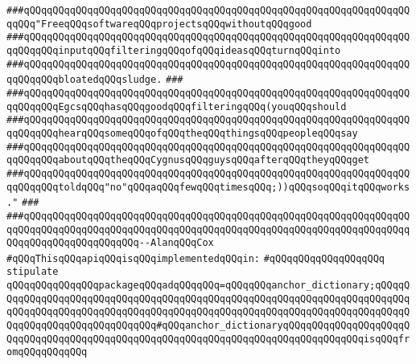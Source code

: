 \newline
\newline
\newline
\verb|###qQQqqQQqqQQqqQQqqQQqqQQqqQQqqQQqqQQqqQQqqQQqqQQqqQQqqQQqqQQqqQQqqQQqqQQq"FreeqQQqsoftwareqQQqprojectsqQQqwithoutqQQqgood|\newline
\verb|###qQQqqQQqqQQqqQQqqQQqqQQqqQQqqQQqqQQqqQQqqQQqqQQqqQQqqQQqqQQqqQQqqQQqqQQqqQQqinputqQQqfilteringqQQqofqQQqideasqQQqturnqQQqinto|\newline
\verb|###qQQqqQQqqQQqqQQqqQQqqQQqqQQqqQQqqQQqqQQqqQQqqQQqqQQqqQQqqQQqqQQqqQQqqQQqqQQqbloatedqQQqsludge.|\newline
\verb|###|\newline
\verb|###qQQqqQQqqQQqqQQqqQQqqQQqqQQqqQQqqQQqqQQqqQQqqQQqqQQqqQQqqQQqqQQqqQQqqQQqqQQqEgcsqQQqhasqQQqgoodqQQqfilteringqQQq(youqQQqshould|\newline
\verb|###qQQqqQQqqQQqqQQqqQQqqQQqqQQqqQQqqQQqqQQqqQQqqQQqqQQqqQQqqQQqqQQqqQQqqQQqqQQqhearqQQqsomeqQQqofqQQqtheqQQqthingsqQQqpeopleqQQqsay|\newline
\verb|###qQQqqQQqqQQqqQQqqQQqqQQqqQQqqQQqqQQqqQQqqQQqqQQqqQQqqQQqqQQqqQQqqQQqqQQqqQQqaboutqQQqtheqQQqCygnusqQQqguysqQQqafterqQQqtheyqQQqget|\newline
\verb|###qQQqqQQqqQQqqQQqqQQqqQQqqQQqqQQqqQQqqQQqqQQqqQQqqQQqqQQqqQQqqQQqqQQqqQQqqQQqtoldqQQq"no"qQQqaqQQqfewqQQqtimesqQQq;))qQQqsoqQQqitqQQqworks."|\newline
\verb|###|\newline
\verb|###qQQqqQQqqQQqqQQqqQQqqQQqqQQqqQQqqQQqqQQqqQQqqQQqqQQqqQQqqQQqqQQqqQQqqQQqqQQqqQQqqQQqqQQqqQQqqQQqqQQqqQQqqQQqqQQqqQQqqQQqqQQqqQQqqQQqqQQqqQQqqQQqqQQqqQQqqQQqqQQq--AlanqQQqCox|\newline
\newline
\newline
\verb|#qQQqThisqQQqapiqQQqisqQQqimplementedqQQqin:|\newline
\verb|#qQQqqQQqqQQqqQQqqQQq|\newline
\newline
\verb|stipulate|\newline
\verb|qQQqqQQqqQQqqQQqpackageqQQqadqQQqqQQq=qQQqqQQqanchor_dictionary;qQQqqQQqqQQqqQQqqQQqqQQqqQQqqQQqqQQqqQQqqQQqqQQqqQQqqQQqqQQqqQQqqQQqqQQqqQQqqQQqqQQqqQQqqQQqqQQqqQQqqQQqqQQqqQQqqQQqqQQqqQQqqQQqqQQqqQQqqQQqqQQqqQQqqQQqqQQqqQQqqQQqqQQqqQQq#qQQqanchor_dictionaryqQQqqQQqqQQqqQQqqQQqqQQqqQQqqQQqqQQqqQQqqQQqqQQqqQQqqQQqqQQqqQQqqQQqqQQqqQQqqQQqqQQqisqQQqfromqQQqqQQqqQQq|\newline
